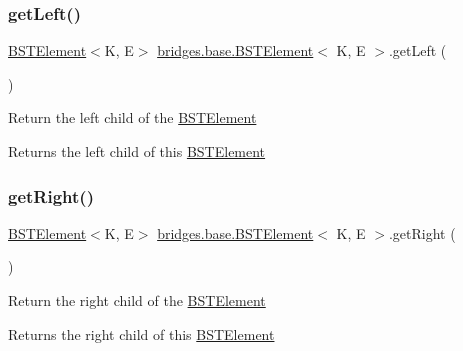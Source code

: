 \subsubsection{\texorpdfstring{get\+Left()}{getLeft()}}
{\footnotesize\ttfamily \hyperlink{classbridges_1_1base_1_1_b_s_t_element}{B\+S\+T\+Element}$<$K, E$>$ \hyperlink{classbridges_1_1base_1_1_b_s_t_element}{bridges.\+base.\+B\+S\+T\+Element}$<$ K, E $>$.get\+Left (\begin{DoxyParamCaption}{ }\end{DoxyParamCaption})}

Return the left child of the \hyperlink{classbridges_1_1base_1_1_b_s_t_element}{B\+S\+T\+Element}

\begin{DoxyReturn}{Returns}
the left child of this \hyperlink{classbridges_1_1base_1_1_b_s_t_element}{B\+S\+T\+Element} 
\end{DoxyReturn}
\mbox{\label{classbridges_1_1base_1_1_b_s_t_element_ae7ed1b98f48acfcfc0a3a5bf6219ce00}} 
\subsubsection{\texorpdfstring{get\+Right()}{getRight()}}
{\footnotesize\ttfamily \hyperlink{classbridges_1_1base_1_1_b_s_t_element}{B\+S\+T\+Element}$<$K, E$>$ \hyperlink{classbridges_1_1base_1_1_b_s_t_element}{bridges.\+base.\+B\+S\+T\+Element}$<$ K, E $>$.get\+Right (\begin{DoxyParamCaption}{ }\end{DoxyParamCaption})}

Return the right child of the \hyperlink{classbridges_1_1base_1_1_b_s_t_element}{B\+S\+T\+Element}

\begin{DoxyReturn}{Returns}
the right child of this \hyperlink{classbridges_1_1base_1_1_b_s_t_element}{B\+S\+T\+Element} 
\end{DoxyReturn}
\mbox{\label{classbridges_1_1base_1_1_b_s_t_element_a51990b684df6998dc25b324dc7631ab4}} 
